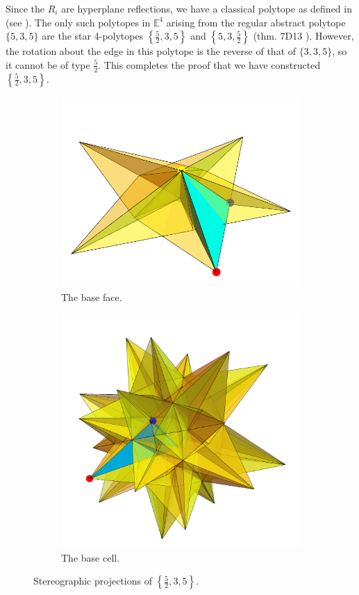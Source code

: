 \documentclass{article}
\theoremstyle{definition}
\begin{document}
	Since the $R_i$ are hyperplane reflections, we have a classical polytope as defined in  (see \cite{mcmullen-4dimensional}). The only such polytopes in $\mathbb{E}^4$ arising from the regular abstract polytope$\{5,3,5\}$ are the star 4-polytopes $\left\{\frac{5}{2},3,5\right\}$ and $\left\{5,3,\frac{5}{2}\right\}$ (thm. 7D13 \cite{abstract-polytopes}). However, the rotation about the edge in this polytope is the reverse of that of $\{3,3,5\}$, so it cannot be of type $\frac{5}{2}$. This completes the proof that we have constructed $\left\{\frac{5}{2},3,5\right\}$.
	
	\begin{figure}[H]
		\begin{center}
			\begin{subfigure}{\linewidth}
				\centering
				\includegraphics[width=0.5\linewidth]{fig11a}
				\caption{The base face.}\label{fig:11a}
			\end{subfigure}
			\begin{subfigure}{\linewidth}
				\centering
				\includegraphics[width=0.7\linewidth]{fig11b}
				\caption{The base cell.}\label{fig:11b}
			\end{subfigure}
		\end{center}
		\caption{Stereographic projections of  $\left\{\frac{5}{2},3,5\right\}$.}\label{fig:11}
	\end{figure}
\end{document}
